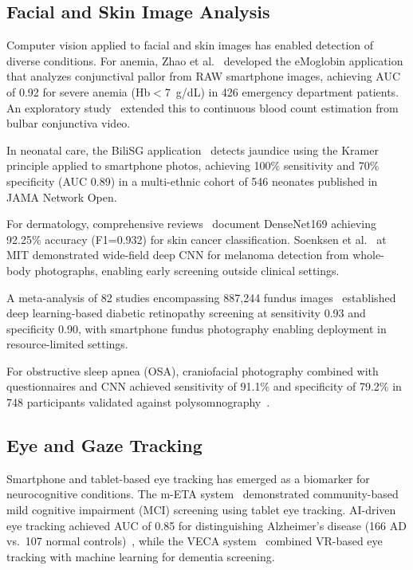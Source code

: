 \documentclass[conference]{IEEEtran}
\begin{document}
\subsection{Facial and Skin Image Analysis}

Computer vision applied to facial and skin images has enabled detection of diverse conditions. For anemia, Zhao et al.~\cite{zhao2024emoglobin} developed the eMoglobin application that analyzes conjunctival pallor from RAW smartphone images, achieving AUC of 0.92 for severe anemia (Hb$<$7~g/dL) in 426 emergency department patients. An exploratory study~\cite{bulbarconjunctiva2026} extended this to continuous blood count estimation from bulbar conjunctiva video.

In neonatal care, the BiliSG application~\cite{ngeow2024bilisg} detects jaundice using the Kramer principle applied to smartphone photos, achieving 100\% sensitivity and 70\% specificity (AUC 0.89) in a multi-ethnic cohort of 546 neonates published in JAMA Network Open.

For dermatology, comprehensive reviews~\cite{naqvi2023skincancer} document DenseNet169 achieving 92.25\% accuracy (F1=0.932) for skin cancer classification. Soenksen et al.~\cite{soenksen2021melanoma} at MIT demonstrated wide-field deep CNN for melanoma detection from whole-body photographs, enabling early screening outside clinical settings.

A meta-analysis of 82 studies encompassing 887,244 fundus images~\cite{drreview2025} established deep learning-based diabetic retinopathy screening at sensitivity 0.93 and specificity 0.90, with smartphone fundus photography enabling deployment in resource-limited settings.

For obstructive sleep apnea (OSA), craniofacial photography combined with questionnaires and CNN achieved sensitivity of 91.1\% and specificity of 79.2\% in 748 participants validated against polysomnography~\cite{osa2025jcsm}.

\subsection{Eye and Gaze Tracking}

Smartphone and tablet-based eye tracking has emerged as a biomarker for neurocognitive conditions. The m-ETA system~\cite{meta2025alzheimer} demonstrated community-based mild cognitive impairment (MCI) screening using tablet eye tracking. AI-driven eye tracking achieved AUC of 0.85 for distinguishing Alzheimer's disease (166 AD vs.\ 107 normal controls)~\cite{eyetrackingad2024}, while the VECA system~\cite{veca2024} combined VR-based eye tracking with machine learning for dementia screening.
\end{document}
